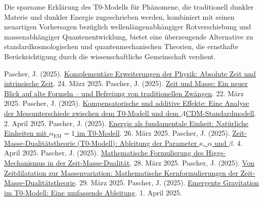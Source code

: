 \documentclass[12pt,a4paper]{article}
\newcommand{\alphaEM}{\alpha_{\text{EM}}}
\begin{document}
	Die sparsame Erklärung des T0-Modells für Phänomene, die traditionell dunkler Materie und dunkler Energie zugeschrieben werden, kombiniert mit seinen neuartigen Vorhersagen bezüglich wellenlängenabhängiger Rotverschiebung und massenabhängiger Quantenentwicklung, bietet eine überzeugende Alternative zu standardkosmologischen und quantenmechanischen Theorien, die ernsthafte Berücksichtigung durch die wissenschaftliche Gemeinschaft verdient.
	
	\begin{thebibliography}{99}
		 Pascher, J. (2025). \href{https://github.com/jpascher/T0-Time-Mass-Duality/tree/main/2/pdf/Deutsch/KomplementPhysikZeit.pdf}{Komplementäre Erweiterungen der Physik: Absolute Zeit und intrinsische Zeit}. 24. März 2025.
		 Pascher, J. (2025). \href{https://github.com/jpascher/T0-Time-Mass-Duality/tree/main/2/pdf/Deutsch/ZeitMasseNeuerBlick.pdf}{Zeit und Masse: Ein neuer Blick auf alte Formeln – und Befreiung von traditionellen Zwängen}. 22. März 2025.
		 Pascher, J. (2025). \href{https://github.com/jpascher/T0-Time-Mass-Duality/tree/main/2/pdf/Deutsch/MessdifferenzenT0Standard.pdf}{Kompensatorische und additive Effekte: Eine Analyse der Messunterschiede zwischen dem T0-Modell und dem \(\Lambda\)CDM-Standardmodell}. 2. April 2025.
		 Pascher, J. (2025). \href{https://github.com/jpascher/T0-Time-Mass-Duality/tree/main/2/pdf/Deutsch/NatEinheitenAlpha1.pdf}{Energie als fundamentale Einheit: Natürliche Einheiten mit \(\alphaEM = 1\) im T0-Modell}. 26. März 2025.
		 Pascher, J. (2025). \href{https://github.com/jpascher/T0-Time-Mass-Duality/tree/main/2/pdf/Deutsch/ZeitMasseT0Params.pdf}{Zeit-Masse-Dualitätstheorie (T0-Modell): Ableitung der Parameter \(\kappa\), \(\alpha\) und \(\beta\)}. 4. April 2025.
		 Pascher, J. (2025). \href{https://github.com/jpascher/T0-Time-Mass-Duality/tree/main/2/pdf/Deutsch/MathHiggsZeitMasse.pdf}{Mathematische Formulierung des Higgs-Mechanismus in der Zeit-Masse-Dualität}. 28. März 2025.
		 Pascher, J. (2025). \href{https://github.com/jpascher/T0-Time-Mass-Duality/tree/main/2/pdf/Deutsch/MathZeitMasseLagrange.pdf}{Von Zeitdilatation zur Massenvariation: Mathematische Kernformulierungen der Zeit-Masse-Dualitätstheorie}. 29. März 2025.
		 Pascher, J. (2025). \href{https://github.com/jpascher/T0-Time-Mass-Duality/tree/main/2/pdf/Deutsch/EmergentGravT0.pdf}{Emergente Gravitation im T0-Modell: Eine umfassende Ableitung}. 1. April 2025.

\end{thebibliography}
\end{document}
